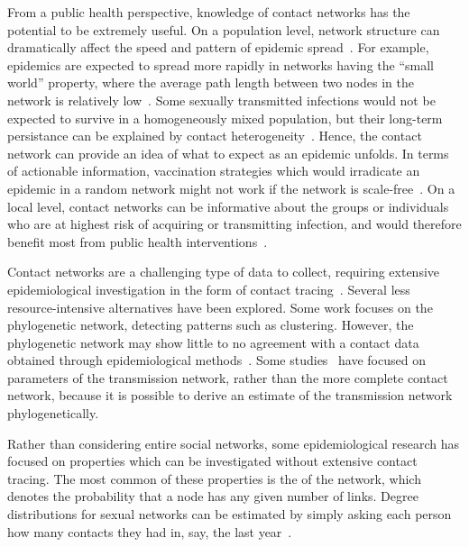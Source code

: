 From a public health perspective, knowledge of contact networks has the
potential to be extremely useful. On a population level, network structure can
dramatically affect the speed and pattern of epidemic
spread~\autocite[\eg][]{barthelemy2005dynamical}. For example, epidemics are
expected to spread more rapidly in networks having the ``small world''
property, where the average path length between two nodes in the network is
relatively low~\autocite{watts1998collective}. Some sexually transmitted
infections would not be expected to survive in a homogeneously mixed
population, but their long-term persistance can be explained by contact
heterogeneity~\autocite{anderson1992infectious, pastor2001epidemic}. Hence, the
contact network can provide an idea of what to expect as an epidemic unfolds.
In terms of actionable information, vaccination strategies which would
irradicate an epidemic in a random network might not work if the network is
scale-free~\autocite[][see \cref{subsec:pa}]{keeling2005networks}. On a local
level, contact networks can be informative about the groups or individuals who
are at highest risk of acquiring or transmitting infection, and would therefore
benefit most from public health interventions~\autocite{wang2015targeting,
little2014using}.

Contact networks are a challenging type of data to collect, requiring extensive
epidemiological investigation in the form of contact
tracing~\autocite{morris1993epidemiology, welch2011statistical,
keeling2005networks}. Several less resource-intensive alternatives have been
explored. Some work focuses on the phylogenetic network, detecting patterns
such as clustering. However, the phylogenetic network may show little to no
agreement with a contact data obtained through epidemiological
methods~\autocite{yirrell1998molecular, resik2007limitations}. Some
studies~\autocite{brown2011transmission} have focused on parameters of the
transmission network, rather than the more complete contact network, because it
is possible to derive an estimate of the transmission network phylogenetically. 

Rather than considering entire social networks, some epidemiological research
has focused on properties which can be investigated without extensive contact
tracing. The most common of these properties is the 
of the network, which denotes the probability that a node has any given number
of links. Degree distributions for sexual networks can be estimated by simply
asking each person how many contacts they had in, say, the last
year~\autocite{liljeros2001web, schneeberger2004scale, colgate1989risk}.

